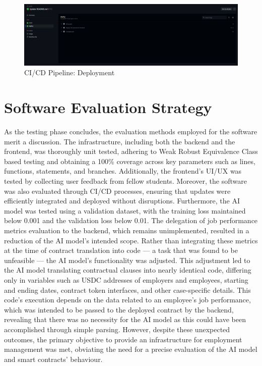\begin{figure}[!ht]
    \centering
    \includegraphics[width=1\linewidth]{LATEX/Appendices/Images/Pipeline_CI_CD/github_actions_CI_CD_pipeline_deployment.png}
    \caption{CI/CD Pipeline: Deployment}
    \label{fig:CI/CD-Pipeline-deployment}
\end{figure}

\section{Software Evaluation Strategy}

As the testing phase concludes, the evaluation methods employed for the software merit a discussion. The infrastructure, including both the backend and the frontend, was thoroughly unit tested, adhering to Weak Robust Equivalence Class based testing and obtaining a 100\% coverage across key parameters such as lines, functions, statements, and branches. Additionally, the frontend's UI/UX was tested by collecting user feedback from fellow students. Moreover, the software was also evaluated through CI/CD processes, ensuring that updates were efficiently integrated and deployed without disruptions. Furthermore, the AI model was tested using a validation dataset, with the training loss maintained below 0.001 and the validation loss below 0.01. The delegation of job performance metrics evaluation to the backend, which remains unimplemented, resulted in a reduction of the AI model's intended scope. Rather than integrating these metrics at the time of contract translation into code — a task that was found to be unfeasible — the AI model's functionality was adjusted. This adjustment led to the AI model translating contractual clauses into nearly identical code, differing only in variables such as USDC addresses of employers and employees, starting and ending dates, contract token interfaces, and other case-specific details. This code's execution depends on the data related to an employee's job performance, which was intended to be passed to the deployed contract by the backend, revealing that there was no necessity for the AI model as this could have been accomplished through simple parsing. However, despite these unexpected outcomes, the primary objective to provide an infrastructure for employment management was met, obviating the need for a precise evaluation of the AI model and smart contracts' behaviour.

